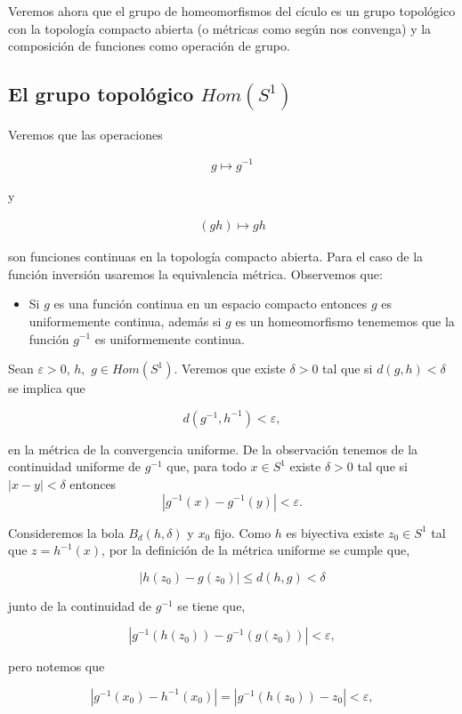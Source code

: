 Veremos ahora que el grupo de homeomorfismos del cículo es un grupo topológico con la topología compacto abierta (o métricas como según nos convenga) y la composición de funciones como operación de grupo.

\subsection*{El grupo topológico $Hom(S^1)$}

Veremos que las operaciones  

\begin{align*}
g \mapsto g^{-1}
\end{align*}

y 

\begin{align*}
(gh) \mapsto gh
\end{align*}

son funciones continuas en la topología compacto abierta. Para el caso de la función inversión usaremos la equivalencia métrica. Observemos que: 
\begin{itemize}
	\item Si $g$ es una función continua en un espacio compacto entonces $g$ es uniformemente continua, además si $g$ es un homeomorfismo tenememos que la función $g^{-1}$ es uniformemente continua. 
\end{itemize}

Sean $\varepsilon >0$, $h,$ $g \in Hom(S^1)$. Veremos que existe $\delta >0$ tal que si $d(g,h) < \delta$  se implica que

$$d(g^{-1},h^{-1}) < \varepsilon,$$

en la métrica de la convergencia uniforme.  De la observación tenemos de la continuidad uniforme de $g^{-1}$  que, para todo $x \in S^1$ existe $\delta >0$ tal que si $|x-y|< \delta$ entonces
$$|g^{-1}(x)-g^{-1}(y)| < \varepsilon.$$

Consideremos la bola $B_d(h,\delta)$ y $x_0$ fijo. Como $h$ es biyectiva existe $z_0 \in S^1$ tal que $z= h^{-1}(x)$, por la definición de la métrica uniforme se cumple que,

$$|h(z_0)-g(z_0)| \leq d(h,g) < \delta $$

junto de la continuidad de $g^{-1}$ se tiene que,

$$|g^{-1}(h(z_0))-g^{-1}(g(z_0))| < \varepsilon,$$

pero notemos que 

$$ |g^{-1}(x_0)-h^{-1}(x_0)|=|g^{-1}(h(z_0))-z_0| < \varepsilon, $$

